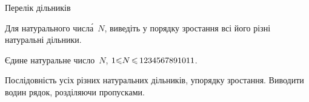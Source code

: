 \begin{problemAllDefault}{Перелік дільників}\label{task:quantity-of-divisors}

Для натурального числ\'{а}~$N$, виведіть у порядку зростання всі його різні натуральні дільники.

\InputFile
Єдине натуральне число~$N$, $1{\<}N\dib{{\<}}1234567891011$.

\OutputFile
Послідовність усіх різних натуральних дільників, у\nolinebreak[3] порядку зростання. 
Виводити в\nolinebreak[3] один рядок, розділяючи пропусками.

\Examples

\begin{exampleSimple}{3em}{20em}%
%
%
\end{exampleSimple}

\end{problemAllDefault}